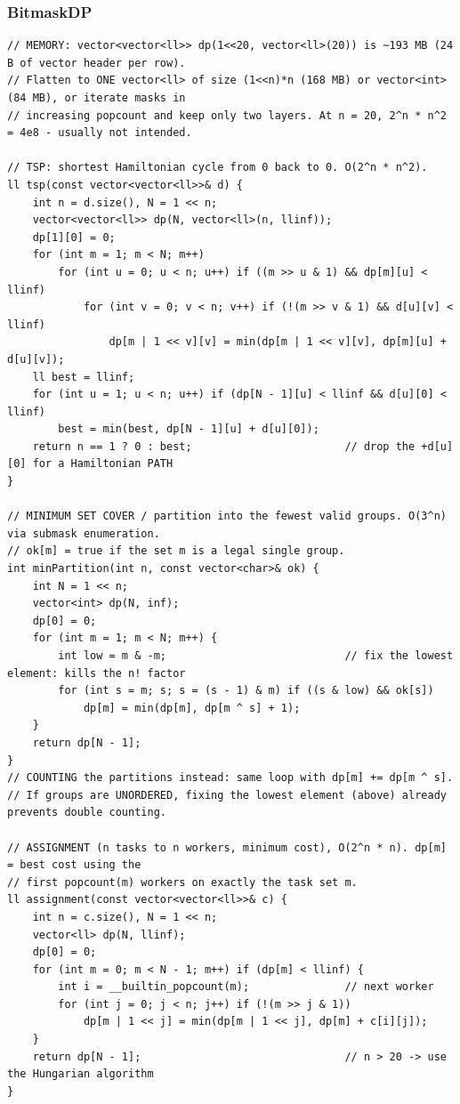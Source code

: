 \documentclass[9pt,a4paper,twocolumn]{extarticle}
\begin{document}
\filbreak
\subsubsection{BitmaskDP}
\nopagebreak
\begin{lstlisting}
// MEMORY: vector<vector<ll>> dp(1<<20, vector<ll>(20)) is ~193 MB (24 B of vector header per row).
// Flatten to ONE vector<ll> of size (1<<n)*n (168 MB) or vector<int> (84 MB), or iterate masks in
// increasing popcount and keep only two layers. At n = 20, 2^n * n^2 = 4e8 - usually not intended.

// TSP: shortest Hamiltonian cycle from 0 back to 0. O(2^n * n^2).
ll tsp(const vector<vector<ll>>& d) {
    int n = d.size(), N = 1 << n;
    vector<vector<ll>> dp(N, vector<ll>(n, llinf));
    dp[1][0] = 0;
    for (int m = 1; m < N; m++)
        for (int u = 0; u < n; u++) if ((m >> u & 1) && dp[m][u] < llinf)
            for (int v = 0; v < n; v++) if (!(m >> v & 1) && d[u][v] < llinf)
                dp[m | 1 << v][v] = min(dp[m | 1 << v][v], dp[m][u] + d[u][v]);
    ll best = llinf;
    for (int u = 1; u < n; u++) if (dp[N - 1][u] < llinf && d[u][0] < llinf)
        best = min(best, dp[N - 1][u] + d[u][0]);
    return n == 1 ? 0 : best;                        // drop the +d[u][0] for a Hamiltonian PATH
}

// MINIMUM SET COVER / partition into the fewest valid groups. O(3^n) via submask enumeration.
// ok[m] = true if the set m is a legal single group.
int minPartition(int n, const vector<char>& ok) {
    int N = 1 << n;
    vector<int> dp(N, inf);
    dp[0] = 0;
    for (int m = 1; m < N; m++) {
        int low = m & -m;                            // fix the lowest element: kills the n! factor
        for (int s = m; s; s = (s - 1) & m) if ((s & low) && ok[s])
            dp[m] = min(dp[m], dp[m ^ s] + 1);
    }
    return dp[N - 1];
}
// COUNTING the partitions instead: same loop with dp[m] += dp[m ^ s].
// If groups are UNORDERED, fixing the lowest element (above) already prevents double counting.

// ASSIGNMENT (n tasks to n workers, minimum cost), O(2^n * n). dp[m] = best cost using the
// first popcount(m) workers on exactly the task set m.
ll assignment(const vector<vector<ll>>& c) {
    int n = c.size(), N = 1 << n;
    vector<ll> dp(N, llinf);
    dp[0] = 0;
    for (int m = 0; m < N - 1; m++) if (dp[m] < llinf) {
        int i = __builtin_popcount(m);               // next worker
        for (int j = 0; j < n; j++) if (!(m >> j & 1))
            dp[m | 1 << j] = min(dp[m | 1 << j], dp[m] + c[i][j]);
    }
    return dp[N - 1];                                // n > 20 -> use the Hungarian algorithm
}


\end{lstlisting}
\end{document}
